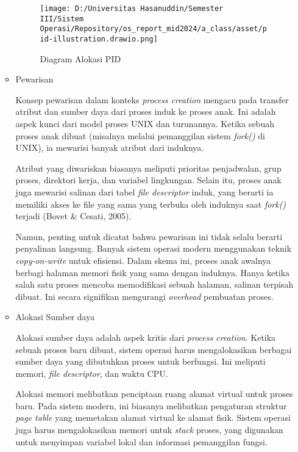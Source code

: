 \documentclass[12pt]{article}
\begin{document}
\begin{itemize}
\begin{itemize}
        \begin{figure}[h]
            \centering
            \texttt{[image: D:/Universitas Hasanuddin/Semester III/Sistem Operasi/Repository/os\_report\_mid2024/a\_class/asset/pid-illustration.drawio.png]}
            \caption{Diagram Alokasi PID}
        \end{figure}

        \item Pewarisan
        
        Konsep pewarisan dalam konteks \textit{process creation} 
        mengacu pada transfer atribut dan sumber daya dari proses 
        induk ke proses anak. Ini adalah aspek kunci dari model 
        proses UNIX dan turunannya. Ketika sebuah proses anak 
        dibuat (misalnya melalui pemanggilan sistem 
        \textit{fork()} di UNIX), ia mewarisi banyak atribut dari 
        induknya.

        Atribut yang diwariskan biasanya meliputi prioritas 
        penjadwalan, grup proses, direktori kerja, dan variabel 
        lingkungan. Selain itu, proses anak juga mewarisi salinan 
        dari tabel \textit{file descriptor} induk, yang berarti 
        ia memiliki akses ke file yang sama yang terbuka oleh 
        induknya saat \textit{fork()} terjadi (Bovet \& Cesati, 
        2005).

        Namun, penting untuk dicatat bahwa pewarisan ini tidak 
        selalu berarti penyalinan langsung. Banyak sistem operasi 
        modern menggunakan teknik \textit{copy-on-write} untuk 
        efisiensi. Dalam skema ini, proses anak awalnya berbagi 
        halaman memori fisik yang sama dengan induknya. Hanya 
        ketika salah satu proses mencoba memodifikasi sebuah 
        halaman, salinan terpisah dibuat. Ini secara signifikan 
        mengurangi \textit{overhead} pembuatan proses.

        \item Alokasi Sumber daya
        
        Alokasi sumber daya adalah aspek kritis dari 
        \textit{process creation}. Ketika sebuah proses baru 
        dibuat, sistem operasi harus mengalokasikan berbagai 
        sumber daya yang dibutuhkan proses untuk berfungsi. Ini 
        meliputi memori, \textit{file descriptor}, dan waktu CPU.

        Alokasi memori melibatkan penciptaan ruang alamat virtual 
        untuk proses baru. Pada sistem modern, ini biasanya 
        melibatkan pengaturan struktur \textit{page table} yang 
        memetakan alamat virtual ke alamat fisik. Sistem operasi 
        juga harus mengalokasikan memori untuk \textit{stack} 
        proses, yang digunakan untuk menyimpan variabel lokal dan 
        informasi pemanggilan fungsi.


\end{itemize}
\end{itemize}
\end{document}

